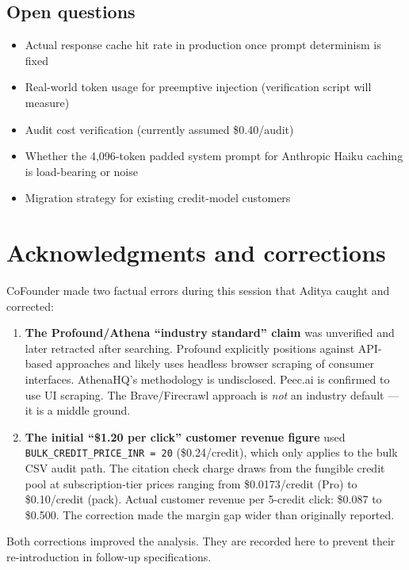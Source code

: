 \documentclass[11pt,letterpaper]{article}
\begin{document}
\subsection{Open questions}

\begin{itemize}[nosep]
  \item Actual response cache hit rate in production once prompt determinism is fixed
  \item Real-world token usage for preemptive injection (verification script will measure)
  \item Audit cost verification (currently assumed \$0.40/audit)
  \item Whether the 4,096-token padded system prompt for Anthropic Haiku caching is load-bearing or noise
  \item Migration strategy for existing credit-model customers
\end{itemize}

\section{Acknowledgments and corrections}

CoFounder made two factual errors during this session that Aditya caught
and corrected:

\begin{enumerate}[nosep]
  \item \textbf{The Profound/Athena ``industry standard'' claim} was
    unverified and later retracted after searching. Profound explicitly
    positions against API-based approaches and likely uses headless browser
    scraping of consumer interfaces. AthenaHQ's methodology is undisclosed.
    Peec.ai is confirmed to use UI scraping. The Brave/Firecrawl approach
    is \textit{not} an industry default --- it is a middle ground.
  \item \textbf{The initial ``\$1.20 per click'' customer revenue figure}
    used \texttt{BULK\_CREDIT\_PRICE\_INR = 20} (\$0.24/credit), which only
    applies to the bulk CSV audit path. The citation check charge draws
    from the fungible credit pool at subscription-tier prices ranging from
    \$0.0173/credit (Pro) to \$0.10/credit (pack). Actual customer revenue
    per 5-credit click: \$0.087 to \$0.500. The correction made the margin
    gap wider than originally reported.
\end{enumerate}

Both corrections improved the analysis. They are recorded here to prevent
their re-introduction in follow-up specifications.
\end{document}

